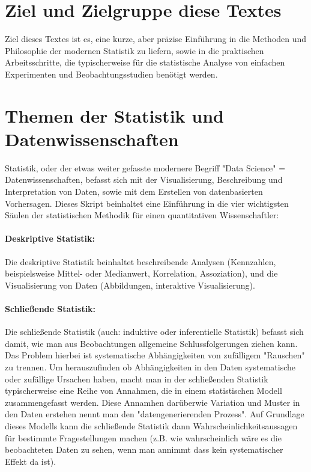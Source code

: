 \documentclass[a4paper,twoside]{tufte-book}\usepackage[]{graphicx}\usepackage[]{color}
\begin{document}
	\section{Ziel und Zielgruppe diese Textes}
	
	Ziel dieses Textes ist es, eine kurze, aber präzise Einführung in die Methoden und Philosophie der modernen Statistik zu liefern, sowie in die praktischen Arbeitsschritte, die typischerweise für die statistische Analyse von einfachen Experimenten und Beobachtungsstudien benötigt werden.
	
	\section{Themen der Statistik und Datenwissenschaften}
	
	Statistik, oder der etwas weiter gefasste modernere Begriff "Data Science" = Datenwissenschaften, befasst sich mit der Visualisierung, Beschreibung und Interpretation von Daten, sowie mit dem Erstellen von datenbasierten Vorhersagen. Dieses Skript beinhaltet eine Einführung in die vier wichtigsten Säulen der statistischen Methodik für einen quantitativen Wissenschaftler:
	
	\paragraph{Deskriptive Statistik:} Die deskriptive Statistik beinhaltet beschreibende Analysen (Kennzahlen, beispielsweise Mittel- oder Medianwert, Korrelation, Assoziation), und die Visualisierung von Daten (Abbildungen, interaktive Visualisierung).
	
	\paragraph{Schließende Statistik:} Die schließende Statistik (auch: induktive oder inferentielle Statistik) befasst sich damit, wie man aus Beobachtungen allgemeine Schlussfolgerungen ziehen kann. Das Problem hierbei ist systematische Abhängigkeiten von zufälligem "Rauschen"  zu trennen. Um herauszufinden ob Abhängigkeiten in den Daten systematische oder zufällige Ursachen haben, macht man in der schließenden Statistik typischerweise eine Reihe von Annahmen, die in einem statistischen Modell zusammengefasst werden. Diese Annamhen darüberwie Variation und Muster in den Daten erstehen nennt man den "datengenerierenden Prozess". Auf Grundlage dieses Modells kann die schließende Statistik dann Wahrscheinlichkeitsaussagen für bestimmte Fragestellungen machen (z.B. wie wahrscheinlich wäre es die beobachteten Daten zu sehen, wenn man annimmt dass kein systematischer Effekt da ist). 
	
\end{document}
